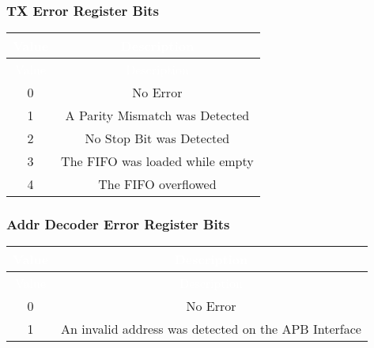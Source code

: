 \subsubsection{TX Error Register Bits}
\renewcommand*{\arraystretch}{1.25}
\begingroup
\small
{}
\begin{longtable}{|c|c|}
    \hline
    \rowcolor{gray}
    \textcolor{white}{Value} & \textcolor{white}{Description}  \\ \hline
    \endfirsthead

    \hline
    \rowcolor{gray}
    \textcolor{white}{Value} & \textcolor{white}{Description}  \\ \hline
    \endhead

    \hline
    \endfoot

    0 & No Error \\ \hline
    1 & A Parity Mismatch was Detected \\ \hline
    2 & No Stop Bit was Detected \\ \hline
    3 & The FIFO was loaded while empty \\ \hline
    4 & The FIFO overflowed \\ \hline
\end{longtable}
\label{table:uart_tx_error}
\endgroup

\subsubsection{Addr Decoder Error Register Bits}
\renewcommand*{\arraystretch}{1.25}
\begingroup
\small
{}
\begin{longtable}{|c|c|}
    \hline
    \rowcolor{gray}
    \textcolor{white}{Value} & \textcolor{white}{Description}  \\ \hline
    \endfirsthead

    \hline
    \rowcolor{gray}
    \textcolor{white}{Value} & \textcolor{white}{Description}  \\ \hline
    \endhead

    \hline
    \endfoot

    0 & No Error \\ \hline
    1 & An invalid address was detected on the APB Interface \\ \hline
\end{longtable}
\label{table:uart_addrdecode_error}
\endgroup


